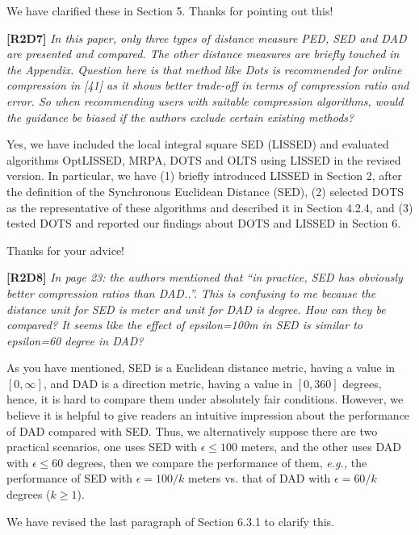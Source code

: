 \documentclass{letter}
\newcommand{\eg}{\emph{e.g.,}\xspace}
\begin{document}
{{We have clarified these in Section 5. Thanks for pointing out this!

\textbf{[R2D7]} \emph{In this paper, only three types of distance measure PED, SED and DAD are presented and compared. The other distance measures are briefly touched in the Appendix. Question here is that method like Dots is recommended for online compression in [41] as it shows better trade-off in terms of compression ratio and error. So when recommending users with suitable compression algorithms, would the guidance be biased if the authors exclude certain existing methods?}

Yes, we have included the local integral square SED (LISSED) and evaluated algorithms OptLISSED, MRPA, DOTS and OLTS using LISSED in the revised version. In particular, we have (1) briefly introduced LISSED in Section 2, after the definition of the Synchronous Euclidean Distance (SED), (2) selected DOTS as the representative of these algorithms and described it in Section 4.2.4, and (3) tested DOTS and reported our findings about DOTS and LISSED in Section 6.

Thanks for your advice!


\textbf{[R2D8]} \emph{In page 23: the authors mentioned that “in practice, SED has obviously better compression ratios than DAD..”. This is confusing to me because the distance unit for SED is meter and unit for DAD is degree. How can they be compared? It seems like the effect of epsilon=100m in SED is similar to epsilon=60 degree in DAD?}

As you have mentioned, SED is a Euclidean distance metric, having a value in $[0, \infty]$, and DAD is a direction metric, having a value in $[0, 360]$ degrees, hence, it is hard to compare them under absolutely fair conditions. However, we believe it is helpful to give readers an intuitive impression about the performance of DAD compared with SED. Thus, we alternatively suppose there are two practical scenarios, one uses SED with $\epsilon  \le  100$ meters, and the other uses DAD with $\epsilon \le 60$ degrees, then we compare the performance of them, \eg the performance of SED with $\epsilon=100/k$ meters vs. that of DAD with $\epsilon=60/k$ degrees ($k\ge 1$). 


{We have revised the last paragraph of Section 6.3.1 to clarify this. }

}}
\end{document}
